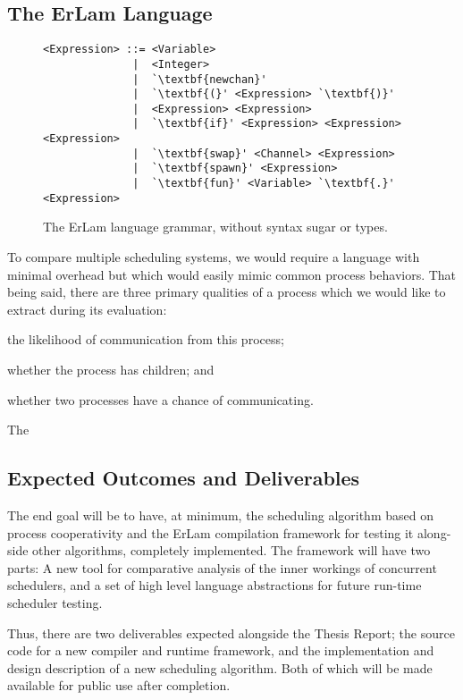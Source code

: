 \subsection{The ErLam Language}

\begin{figure} %
\centering
\begin{BVerbatim}[commandchars=\\\{\}]
<Expression> ::= <Variable> 
              |  <Integer>
              |  `\textbf{newchan}'
              |  `\textbf{(}' <Expression> `\textbf{)}'
              |  <Expression> <Expression>
              |  `\textbf{if}' <Expression> <Expression> <Expression>
              |  `\textbf{swap}' <Channel> <Expression>
              |  `\textbf{spawn}' <Expression>
              |  `\textbf{fun}' <Variable> `\textbf{.}' <Expression>
\end{BVerbatim}
\caption{The ErLam language grammar, without syntax sugar or types.}
\label{fig:grammer}
\end{figure}

To compare multiple scheduling systems, we would require a language with minimal overhead but which would easily 
mimic common process behaviors. That being said, there are three primary qualities of a process which we would like to extract during its evaluation:
\begin{inparaenum}
\item the likelihood of communication from this process;
\item whether the process has children; and
\item whether two processes have a chance of communicating.
\end{inparaenum} 
The


\subsection{Expected Outcomes and Deliverables}

The end goal will be to have, at minimum, the scheduling algorithm based on process cooperativity and 
the ErLam compilation framework for testing it along-side other algorithms, completely implemented. The 
framework will have two parts: A new tool for comparative analysis of the inner workings of concurrent 
schedulers, and a set of high level language abstractions for future run-time scheduler testing.

Thus, there are two deliverables expected alongside the Thesis Report; the source code for a new compiler 
and runtime framework, and the implementation and design description of a new scheduling algorithm. Both
of which will be made available for public use after completion.

